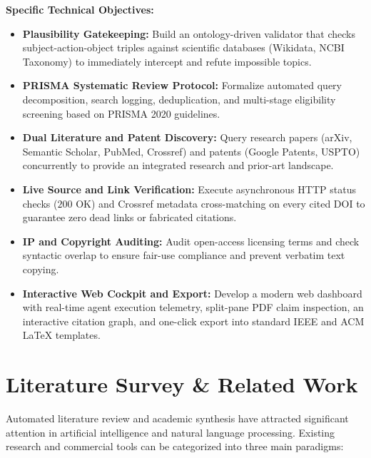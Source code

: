\documentclass[11pt,a4paper]{article}
\begin{document}
\noindent
\textbf{Specific Technical Objectives:}
\begin{itemize}[leftmargin=*,noitemsep]
    \item \textbf{Plausibility Gatekeeping:} Build an ontology-driven validator that checks subject-action-object triples against scientific databases (Wikidata, NCBI Taxonomy) to immediately intercept and refute impossible topics.
    \item \textbf{PRISMA Systematic Review Protocol:} Formalize automated query decomposition, search logging, deduplication, and multi-stage eligibility screening based on PRISMA 2020 guidelines.
    \item \textbf{Dual Literature and Patent Discovery:} Query research papers (arXiv, Semantic Scholar, PubMed, Crossref) and patents (Google Patents, USPTO) concurrently to provide an integrated research and prior-art landscape.
    \item \textbf{Live Source and Link Verification:} Execute asynchronous HTTP status checks ($200\text{ OK}$) and Crossref metadata cross-matching on every cited DOI to guarantee zero dead links or fabricated citations.
    \item \textbf{IP and Copyright Auditing:} Audit open-access licensing terms and check syntactic overlap to ensure fair-use compliance and prevent verbatim text copying.
    \item \textbf{Interactive Web Cockpit and Export:} Develop a modern web dashboard with real-time agent execution telemetry, split-pane PDF claim inspection, an interactive citation graph, and one-click export into standard IEEE and ACM LaTeX templates.
\end{itemize}

\section{Literature Survey \& Related Work}
Automated literature review and academic synthesis have attracted significant attention in artificial intelligence and natural language processing. Existing research and commercial tools can be categorized into three main paradigms:
\end{document}

